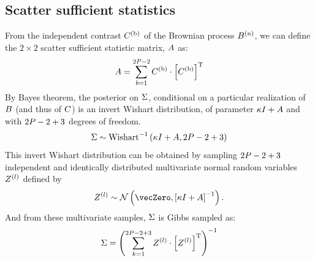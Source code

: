 \documentclass{article}
\begin{document}
	\subsection{Scatter sufficient statistics}
	From the independent contrast $C^{(\text{b})}$ of the Brownian process $B^{(\text{n})}$, we can define the $2 \times 2$ scatter sufficient statistic matrix, $A$ as:
	\begin{equation}
		A = \sum\limits_{b=1}^{2 P - 2} C^{(\text{b})} \cdot \left[C^{(\text{b})}\right]^{\text{T}}
	\end{equation}
	By Bayes theorem, the {posterior} on $\Sigma$, conditional on a particular realization of $B$ (and thus of $C$) is an invert Wishart distribution, of parameter $\kappa I + A$ and with $2 P - 2 + 3$ degrees of freedom.
	\begin{equation}
		\Sigma \sim \text{Wishart}^{-1}\left( \kappa I + A, 2 P - 2 + 3\right)
	\end{equation}
	This invert Wishart distribution can be obtained by sampling $2 P - 2 + 3$ independent and identically distributed multivariate normal random variables $Z^{(l)}$ defined by
	\begin{equation}
		\Multivariate\indiceexp \sim \mathcal{N} \left( \vecZero, \left[\covariancekappa \Identitymatrix + \Scattermatrix\right]^{-1} \right).
	\end{equation}
	And from these multivariate samples, $\Sigma$ is Gibbs sampled as:
	\begin{equation}
		\Sigma = \left( \sum\limits_{k=1}^{2 P - 2 + 3} Z^{(l)} \cdot \left[Z^{(l)} \right] ^{\text{T}} \right)^{-1}
	\end{equation}

	
\end{document}
